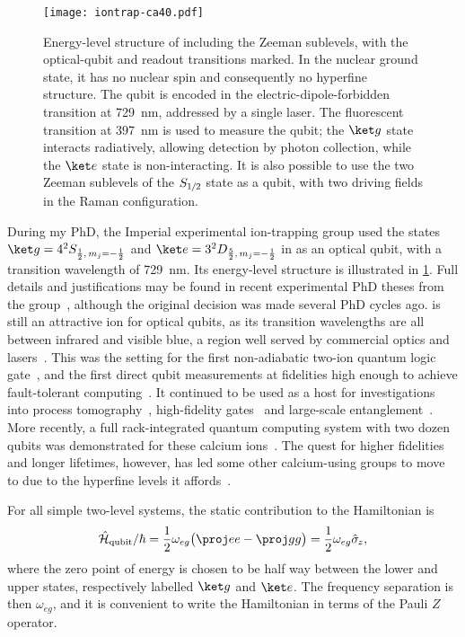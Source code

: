 \begin{figure}%
    \texttt{[image: iontrap-ca40.pdf]}%
    \caption[Energy-level structure of ]{\label{fig:iontrap-ca40}%
        Energy-level structure of  including the Zeeman sublevels, with the optical-qubit and readout transitions marked.
        In the nuclear ground state, it has no nuclear spin and consequently no hyperfine structure.
        The qubit is encoded in the electric-dipole-forbidden transition at \qty{729}{\nano\m}, addressed by a single laser.
        The fluorescent transition at \qty{397}{\nano\m} is used to measure the qubit; the $\ket g$ state interacts radiatively, allowing detection by photon collection, while the $\ket e$ state is non-interacting.
        It is also possible to use the two Zeeman sublevels of the $S_{1\mkern-1mu/\mkern-1mu2}$ state as a qubit, with two driving fields in the Raman configuration.
    }%
\end{figure}

During my PhD, the Imperial experimental ion-trapping group used the states $\ket g = 4^2S_{\frac12,\,m_j=-\frac12}$ and $\ket e = 3^2D_{\frac52,\,m_j=-\frac12}$ in  as an optical qubit, with a transition wavelength of \qty{729}{\nano\m}.
Its energy-level structure is illustrated in \cref{fig:iontrap-ca40}.
Full details and justifications may be found in recent experimental PhD theses from the group~\cite{Hrmo2018,Jarlaud2018,Joshi2018}, although the original decision was made several PhD cycles ago.
 is still an attractive ion for optical qubits, as its transition wavelengths are all between infrared and visible blue, a region well served by commercial optics and lasers~\cite{Schmidt-Kaler2003a}.
This was the setting for the first non-adiabatic two-ion quantum logic gate~\cite{Schmidt-Kaler2003}, and the first direct qubit measurements at fidelities high enough to achieve fault-tolerant computing~\cite{Myerson2008}.
It continued to be used as a host for investigations into process tomography~\cite{Riebe2006}, high-fidelity gates~\cite{Benhelm2008} and large-scale entanglement~\cite{Monz2011}.
More recently, a full rack-integrated quantum computing system with two dozen qubits was demonstrated for these calcium ions~\cite{Pogorelov2021}.
The quest for higher fidelities and longer lifetimes, however, has led some other calcium-using groups to move to  due to the hyperfine levels it affords~\cite{Harty2016,Schaefer2018}.

For all simple two-level systems, the static contribution to the Hamiltonian is
\begin{equation}\label{eq:iontrap-qubit-hamiltonian}
\H_{\text{qubit}}/\hbar = \frac12\omega_{eg}\bigl(\proj ee - \proj gg\bigr) = \frac12\omega_{eg}\sz,
\end{equation}
where the zero point of energy is chosen to be half way between the lower and upper states, respectively labelled $\ket g$ and $\ket e$.
The frequency separation is then $\omega_{eg}$, and it is convenient to write the Hamiltonian in terms of the Pauli $Z$ operator.


